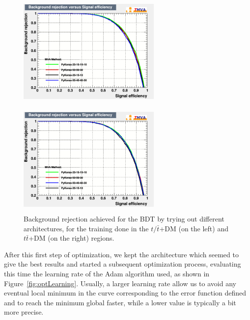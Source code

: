 \documentclass[a4paper, 10pt, openright]{report}
\begin{document}
\begin{appendices}
\begin{figure}[htbp]
\centering
\begin{minipage}[b]{.48\textwidth}
\includegraphics[width=7cm, height=5.7cm]{figs/ANN_arch_ST.png}
\end{minipage}\hfill
\begin{minipage}[b]{.48\textwidth}
\includegraphics[width=7cm, height=5.7cm]{figs/ANN_arch_TTbar.png}
\end{minipage} \hfill
\caption{Background rejection achieved for the \ac{BDT} by trying out different architectures, for the training done in the $t/ \bar t$+DM (on the left) and $t \bar t$+DM (on the right) regions.}
\label{fig:optLayers}
\end{figure}

After this first step of optimization, we kept the architecture which seemed to give the best results and started a subsequent optimization process, evaluating this time the learning rate of the Adam algorithm used, as shown in Figure~\ref{fig:optLearning}. Usually, a larger learning rate allow us to avoid any eventual local minimum in the curve corresponding to the error function defined and to reach the minimum global faster, while a lower value is typically a bit more precise. %


\end{appendices}
\end{document}

